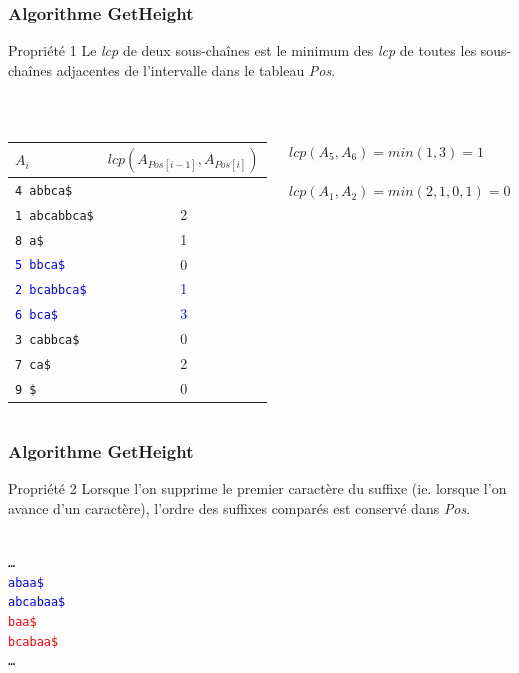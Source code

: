 \documentclass[10pt]{beamer}
\begin{document}
\begin{frame}
  \frametitle{Algorithme GetHeight}

  \begin{block}{Propriété 1}
  Le \textit{lcp} de deux sous-chaînes est le minimum des \textit{lcp} de
  toutes les sous-chaînes adjacentes de l'intervalle dans le tableau
  \textit{Pos}.
  \end{block}
  \hfill \\

  \begin{columns}
    \begin{column}{.48\textwidth}
    \scriptsize
    \begin{tabular}{lc}
      $A_{i}$ & $\mathit{lcp}(A_{\mathit{Pos}[i-1]}, A_{\mathit{Pos}[i]})$\\
      \hline
      \texttt{4 abbca\$}                      & \\
      \texttt{1 abcabbca\$}                   & 2\\
      \texttt{8 a\$}                          & 1\\
      \texttt{\textcolor{blue}{5 bbca\$}}     & 0\\
      \texttt{\textcolor{blue}{2 bcabbca\$}}  & \textcolor{blue}{1}\\
      \texttt{\textcolor{blue}{6 bca\$}}      & \textcolor{blue}{3}\\
      \texttt{3 cabbca\$}                     & 0\\
      \texttt{7 ca\$}                         & 2\\
      \texttt{9 \$}                           & 0\\
    \end{tabular}
    \normalsize
    \end{column}
    \begin{column}{.48\textwidth}
    $\mathit{lcp}(A_{5}, A_{6}) = \mathit{min}(1, 3) = 1$\\ \hfill \\

    $\mathit{lcp}(A_{1}, A_{2}) = \mathit{min}(2, 1, 0, 1) = 0$
    \end{column}
  \end{columns}
\end{frame}

\begin{frame}
  \frametitle{Algorithme GetHeight}

  \begin{block}{Propriété 2}
  Lorsque l'on supprime le premier caractère du suffixe (ie. lorsque l'on
  avance d'un caractère), l'ordre des suffixes comparés est conservé dans
  \textit{Pos}.
  \end{block}
  \hfill \\

  \texttt{\ldots\\
  \textcolor{blue}{abaa\$}\\
  \textcolor{blue}{abcabaa\$}\\
  \textcolor{red}{baa\$}\\
  \textcolor{red}{bcabaa\$}\\
  \ldots}\\
\end{frame}
\end{document}
